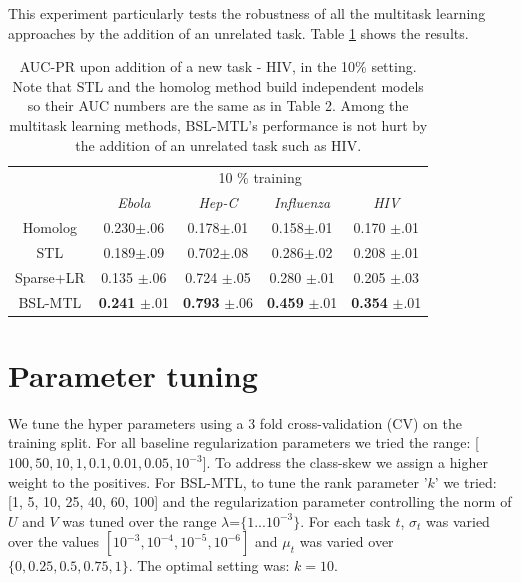 \documentclass[a4paper,11pt]{article}
\begin{document}
This experiment particularly tests the robustness of all the multitask learning approaches by the addition of an unrelated task.
Table \ref{hivresults} shows the results. 

\begin{table}[h]\caption{AUC-PR upon addition of a new task - HIV, in the 10\% setting. Note that STL and the homolog method build independent models so their AUC numbers are the same as in Table 2. Among the multitask learning methods, BSL-MTL's performance is not hurt by the addition of an unrelated task such as HIV.}
\label{hivresults}
\begin{small}
\begin{center}
\begin{tabular}{c|cccc}
\toprule
& \multicolumn{4}{c}{10 \% training } \\
& \textit{Ebola} & \textit{Hep-C} & \textit{Influenza} & \textit{HIV} \\ \midrule
Homolog & 0.230$\pm$.06 & 0.178$\pm$.01 & 0.158$\pm$.01 & 0.170 $\pm$.01 \\
STL  & 0.189$\pm$.09 & 0.702$\pm$.08 & 0.286$\pm$.02  & 0.208 $\pm$.01 \\ 
Sparse+LR & 0.135 $\pm$.06 & 0.724 $\pm$.05 & 0.280 $\pm$.01 & 0.205 $\pm$.03  \\ 
BSL-MTL & \textbf{0.241} $\pm$.01 & \textbf{0.793} $\pm$.06 & \textbf{0.459} $\pm$.01 & \textbf{0.354} $\pm$.01  \\ \bottomrule
\end{tabular}
\end{center}
\end{small}
\end{table}




\section{Parameter tuning}
We tune the hyper parameters using a 3 fold cross-validation (CV) on the training split. For all baseline regularization parameters %
we tried the range: [$100, 50, 10, 1, 0.1, 0.01, 0.05, 10^{-3}$]. To address the class-skew we 
assign a higher weight to the positives. For BSL-MTL, to tune the rank parameter '$k$' we tried: [1, 5, 10, 25, 40, 60, 100] and the regularization parameter controlling the norm of $U$ and $V$ was tuned over the range $\lambda$=$\{1 ... 10^{-3}\}$. For each task $t$, $\sigma_t$ was varied over the values $[10^{-3}, 10^{-4}, 10^{-5}, 10^{-6}]$ and
$\mu_t$ was varied over $\{0, 0.25, 0.5, 0.75, 1\}$.
The optimal setting was:  $k=10$. %
\end{document}
